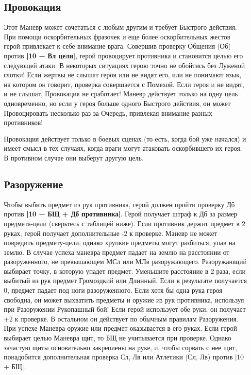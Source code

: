 \subsection{Провокация}
Этот Маневр может сочетаться с любым другим и требует Быстрого действия. При помощи оскорбительных фразочек и еще более оскорбительных жестов герой привлекает к себе внимание врага. Совершив проверку Общения (Об) против \textbf{|10 + Вл цели|}, герой провоцирует противника и становится целью его следующей атаки. В некоторых ситуациях герою точно не обойтись без Луженой глотки!
Если жертвы не слышат героя или не видят его, или не понимают язык, на котором он говорит, проверка совершается с Помехой. Если героя и не видят, и не слышат, Провокация не сработает! Маневр действует только на одну цель одновременно, но если у героя больше одного Быстрого действия, он может Провоцировать несколько раз за Очередь, привлекая внимание разных противников!
\begin{tcolorbox}
Провокация действует только в боевых сценах (то есть, когда бой уже начался) и имеет смысл в тех случаях, когда враги могут атаковать оскорбившего их героя. В противном случае они выберут другую цель. 
\end{tcolorbox}
\subsection{Разоружение}
Чтобы выбить предмет из рук противника, герой должен пройти проверку Дб против \textbf{|10 + БЩ + Дб противника|}. Герой получает штраф к Дб за размер предмета-цели (сверьтесь с таблицей ниже). Если противник держит предмет в 2 руках, герой получает дополнительные -2 к проверке. Маневр не может повредить предмету-цели, однако хрупкие предметы могут разбиться, упав на землю. В случае успеха маневра предмет падает на землю на расстоянии от разоруженного, не превышающем МСл или МЛв разоружающего. Разоружающий выбирает точку, в которую упадет предмет. Уменьшите расстояние в 2 раза, если выбитый из рук предмет Громоздкий или Длинный. Если в результате получается 0, предмет падает под ноги разоруженного.
\newline
Если хотя бы одна рука героя свободна, он может выхватить предметы и оружие из рук противника, используя при Разоружении Рукопашный бой! Если герой использует обе руки, он получает +2 к проверке. В остальном он действует по обычным правилам Разоружения. При успехе Маневра оружие или предмет оказывается в его руках. Если герой выбирает целью Маневра щит, то БЩ не учитывается при проверке. Однако зачастую щиты основательно закреплены на руке, и, чтобы сорвать с нее щит, понадобится дополнительная проверка Сл, Лв или Атлетики (Сл, Лв) против |10 + БЩ|.
